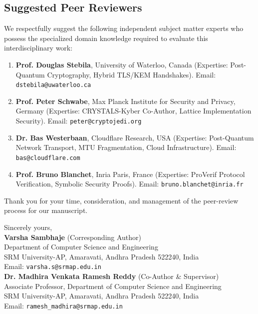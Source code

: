 \documentclass[11pt,a4paper]{article}
\begin{document}
\subsection*{Suggested Peer Reviewers}
We respectfully suggest the following independent subject matter experts who possess the specialized domain knowledge required to evaluate this interdisciplinary work:
\begin{enumerate}
    \item \textbf{Prof. Douglas Stebila}, University of Waterloo, Canada (Expertise: Post-Quantum Cryptography, Hybrid TLS/KEM Handshakes). Email: \texttt{dstebila@uwaterloo.ca}
    \item \textbf{Prof. Peter Schwabe}, Max Planck Institute for Security and Privacy, Germany (Expertise: CRYSTALS-Kyber Co-Author, Lattice Implementation Security). Email: \texttt{peter@cryptojedi.org}
    \item \textbf{Dr. Bas Westerbaan}, Cloudflare Research, USA (Expertise: Post-Quantum Network Transport, MTU Fragmentation, Cloud Infrastructure). Email: \texttt{bas@cloudflare.com}
    \item \textbf{Prof. Bruno Blanchet}, Inria Paris, France (Expertise: ProVerif Protocol Verification, Symbolic Security Proofs). Email: \texttt{bruno.blanchet@inria.fr}
\end{enumerate}

Thank you for your time, consideration, and management of the peer-review process for our manuscript.

\vspace{14pt}

Sincerely yours, \\[8pt]
\textbf{Varsha Sambhaje} (Corresponding Author) \\
Department of Computer Science and Engineering \\
SRM University-AP, Amaravati, Andhra Pradesh 522240, India \\
Email: \texttt{varsha.s@srmap.edu.in} \\[10pt]
\textbf{Dr. Madhira Venkata Ramesh Reddy} (Co-Author \& Supervisor) \\
Associate Professor, Department of Computer Science and Engineering \\
SRM University-AP, Amaravati, Andhra Pradesh 522240, India \\
Email: \texttt{ramesh\_madhira@srmap.edu.in}
\end{document}
